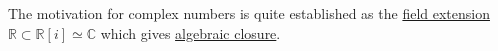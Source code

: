 The motivation for complex numbers is quite established as the \hyperref[alg-def:field-extension]{field extension} $\mathbb{R} \subset \mathbb{R}[i] \simeq \mathbb{C}$ which gives \hyperref[alg-def:algebraic-closure]{algebraic closure}. 

